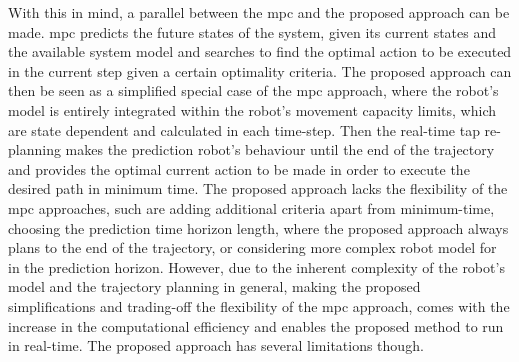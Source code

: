 With this in mind, a parallel between the \gls{mpc} \cite{Kouvaritakis2016} and the proposed approach can be made. \gls{mpc} predicts the future states of the system, given its current states and the available system model and searches to find the optimal action to be executed in the current step given a certain optimality criteria. The proposed approach can then be seen as a simplified special case of the \gls{mpc} approach, where the robot's model is entirely integrated within the robot's movement capacity limits, which are state dependent and calculated in each time-step. Then the real-time \gls{tap} re-planning makes the prediction robot's behaviour until the end of the trajectory and provides the optimal current action to be made in order to execute the desired path in minimum time. The proposed approach lacks the flexibility of the \gls{mpc} approaches, such are adding additional criteria apart from minimum-time,  choosing the prediction time horizon length, where the proposed approach always plans to the end of the trajectory, or considering more complex robot model for in the prediction horizon. However, due to the inherent complexity of the robot's model and the trajectory planning in general, making the proposed simplifications and trading-off the flexibility of the \gls{mpc} approach, comes with the increase in the computational efficiency and enables the proposed method to run in real-time. The proposed approach has several limitations though.



